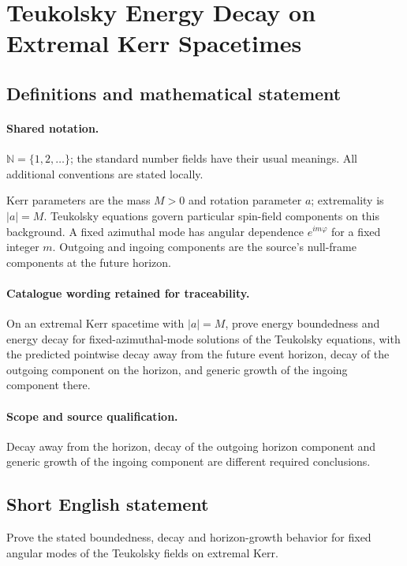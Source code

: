 \documentclass[11pt]{article}
\begin{document}
\section{Teukolsky Energy Decay on Extremal Kerr Spacetimes}\label{statement}

\subsection{Definitions and mathematical statement}

\paragraph{Shared notation.}$\mathbb N=\{1,2,\ldots\}$; the standard number fields have their usual meanings. All additional conventions are stated locally.


Kerr parameters are the mass $M>0$ and rotation parameter $a$; extremality is $|a|=M$. Teukolsky equations govern particular spin-field components on this background. A fixed azimuthal mode has angular dependence $e^{im\varphi}$ for a fixed integer $m$. Outgoing and ingoing components are the source's null-frame components at the future horizon.

\paragraph{Catalogue wording retained for traceability.}
On an extremal Kerr spacetime with $|a|=M$, prove energy boundedness and energy decay for fixed-azimuthal-mode solutions of the Teukolsky equations, with the predicted pointwise decay away from the future event horizon, decay of the outgoing component on the horizon, and generic growth of the ingoing component there.

\paragraph{Scope and source qualification.}Decay away from the horizon, decay of the outgoing horizon component and generic growth of the ingoing component are different required conclusions.
\subsection{Short English statement}
Prove the stated boundedness, decay and horizon-growth behavior for fixed angular modes of the Teukolsky fields on extremal Kerr.
\end{document}
